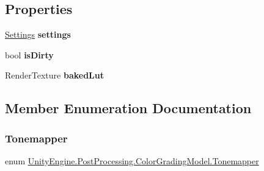 \subsection*{Properties}
\begin{DoxyCompactItemize}
\item 
\mbox{\label{class_unity_engine_1_1_post_processing_1_1_color_grading_model_a340b78e970e8cc5c66abbd4957d88b9c}} 
\mbox{\hyperlink{struct_unity_engine_1_1_post_processing_1_1_color_grading_model_1_1_settings}{Settings}} {\bfseries settings}
\item 
\mbox{\label{class_unity_engine_1_1_post_processing_1_1_color_grading_model_a05a2c8285ca219e5846080bec932b988}} 
bool {\bfseries is\+Dirty}
\item 
\mbox{\label{class_unity_engine_1_1_post_processing_1_1_color_grading_model_ab93b4bd2bb81196e8751efa337f451f3}} 
Render\+Texture {\bfseries baked\+Lut}
\end{DoxyCompactItemize}


\subsection{Member Enumeration Documentation}
\mbox{\label{class_unity_engine_1_1_post_processing_1_1_color_grading_model_a4955bb9dfed7e27c93e7493ff66f3de6}} 
\subsubsection{\texorpdfstring{Tonemapper}{Tonemapper}}
{\footnotesize\ttfamily enum \mbox{\hyperlink{class_unity_engine_1_1_post_processing_1_1_color_grading_model_a4955bb9dfed7e27c93e7493ff66f3de6}{Unity\+Engine.\+Post\+Processing.\+Color\+Grading\+Model.\+Tonemapper}}\hspace{0.3cm}{\ttfamily [strong]}}

